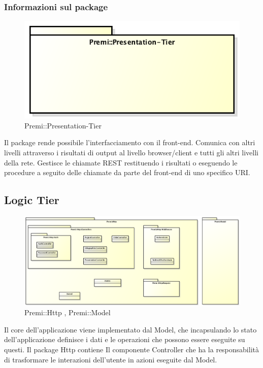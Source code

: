 	\subsubsection*{Informazioni sul package}
		\begin{figure}[h]
			\centering
			\includegraphics[width=0.5\linewidth]{img/premi_presentation-tier}
			\caption[Premi::Presentation-Tier]{Premi::Presentation-Tier}
		\end{figure}
		Il package rende possibile l'interfacciamento con il \gls{front-end}. Comunica con altri livelli attraverso i risultati di output al livello browser/client e tutti gli altri livelli della rete.
		Gestisce le chiamate \gls{REST} restituendo i risultati o eseguendo le procedure a seguito delle chiamate da parte del \gls{front-end} di uno specifico \gls{URI}. 
		
\newpage
		
\subsection{Logic Tier}
	\begin{figure}[h]
		\centering
		\includegraphics[width=\linewidth]{img/back-end_logic-tier_package}
		\caption[Premi::Http , Premi::Model]{Premi::Http , Premi::Model}
	\end{figure}
	Il core dell'applicazione viene implementato dal Model, che incapsulando lo stato dell'applicazione definisce i dati e le operazioni che possono essere eseguite su questi. Il package Http contiene Il componente Controller che ha la responsabilità di trasformare le interazioni dell'utente in azioni eseguite dal Model.
	
